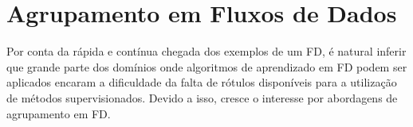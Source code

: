 \chapter{Agrupamento em Fluxos de Dados}  \label{ChAFD}






Por conta da rápida e contínua chegada dos exemplos de um FD, é natural inferir que grande parte dos domínios onde algoritmos de aprendizado em FD podem ser aplicados encaram a dificuldade da falta de rótulos disponíveis para a utilização de métodos supervisionados. Devido a isso, cresce o interesse por abordagens de agrupamento em FD.









